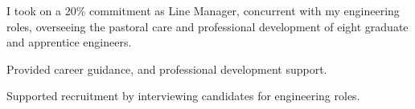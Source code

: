 I took on a 20\% commitment as Line Manager, concurrent with my engineering roles, overseeing the pastoral care and professional development of eight graduate and apprentice engineers.
\vspace{0.25em}
\begin{tightemize}
  \item Provided career guidance, and professional development support.
  \item Supported recruitment by interviewing candidates for engineering roles.
\end{tightemize}
\sectionsep{}
\vfill{}
